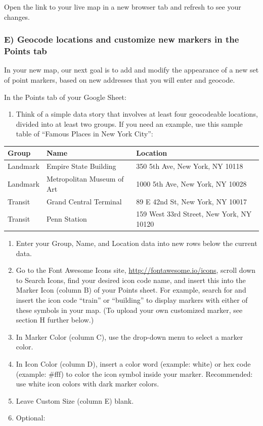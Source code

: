 \documentclass[
  english,
]{book}
\providecommand{\tightlist}{%
  \setlength{\itemsep}{0pt}\setlength{\parskip}{0pt}}
\begin{document}
Open the link to your live map in a new browser tab and refresh to see your changes.

\hypertarget{e-geocode-locations-and-customize-new-markers-in-the-points-tab}{%
\subsubsection*{E) Geocode locations and customize new markers in the Points tab}\label{e-geocode-locations-and-customize-new-markers-in-the-points-tab}}

In your new map, our next goal is to add and modify the appearance of a new set of point markers, based on new addresses that you will enter and geocode.

In the Points tab of your Google Sheet:

\begin{enumerate}
\def\labelenumi{\arabic{enumi})}
\tightlist
\item
  Think of a simple data story that involves at least four geocodeable locations, divided into at least two groups. If you need an example, use this sample table of ``Famous Places in New York City'':
\end{enumerate}

\begin{longtable}[]{@{}lll@{}}
\toprule
Group & Name & Location\tabularnewline
\midrule
\endhead
Landmark & Empire State Building & 350 5th Ave, New York, NY 10118\tabularnewline
Landmark & Metropolitan Museum of Art & 1000 5th Ave, New York, NY 10028\tabularnewline
Transit & Grand Central Terminal & 89 E 42nd St, New York, NY 10017\tabularnewline
Transit & Penn Station & 159 West 33rd Street, New York, NY 10120\tabularnewline
\bottomrule
\end{longtable}

\begin{enumerate}
\def\labelenumi{\arabic{enumi})}
\setcounter{enumi}{1}
\item
  Enter your Group, Name, and Location data into new rows below the current data.
\item
  Go to the Font Awesome Icons site, \url{http://fontawesome.io/icons}, scroll down to Search Icons, find your desired icon code name, and insert this into the Marker Icon (column B) of your Points sheet. For example, search for and insert the icon code ``train'' or ``building'' to display markers with either of these symbols in your map. (To upload your own customized marker, see section H further below.)
\item
  In Marker Color (column C), use the drop-down menu to select a marker color.
\item
  In Icon Color (column D), insert a color word (example: white) or hex code (example: \#fff) to color the icon symbol inside your marker. Recommended: use white icon colors with dark marker colors.
\item
  Leave Custom Size (column E) blank.
\item
  Optional:
\end{enumerate}
\end{document}
